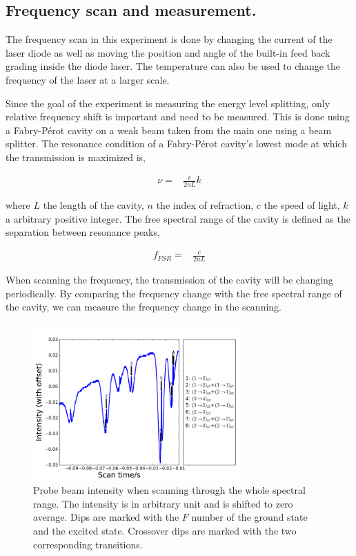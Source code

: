 \documentclass[aps,twocolumn,secnumarabic,balancelastpage,amsmath,amssymb,nofootinbib]{revtex4}
\newcommand{\eqar}[1]
{
  \begin{align*}
    #1
  \end{align*}
}
\begin{document}
\subsection{Frequency scan and measurement.}
The frequency scan in this experiment is done by changing the current of the laser diode as well as moving the position and angle of the built-in feed back grading inside the diode laser. The temperature can also be used to change the frequency of the laser at a larger scale.

Since the goal of the experiment is measuring the energy level splitting, only relative frequency shift is important and need to be measured. This is done using a Fabry-P\'erot cavity on a weak beam taken from the main one using a beam splitter. The resonance condition of a Fabry-P\'erot cavity's lowest mode at which the transmission is maximized is,
\eqar{
  \nu=&\frac{c}{2nL}k
}
where $L$ the length of the cavity, $n$ the index of refraction, $c$ the speed of light, $k$ a arbitrary positive integer. The free spectral range of the cavity is defined as the separation between resonance peaks,
\eqar{
  f_{FSR}=&\frac{c}{2nL}
}
When scanning the frequency, the transmission of the cavity will be changing periodically. By comparing the frequency change with the free spectral range of the cavity, we can measure the frequency change in the scanning.
\begin{figure}
  \includegraphics[width=8cm]{../all_data/4-18/20130418-14_12_48_probe.png}
  \caption{Probe beam intensity when scanning through the whole spectral range. The intensity is in arbitrary unit and is shifted to zero average. Dips are marked with the $F$ number of the ground state and the excited state. Crossover dips are marked with the two corresponding transitions.}
  \label{whole_probe}
\end{figure}
\end{document}
